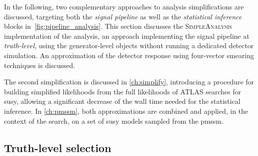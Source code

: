 In the following, two complementary approaches to analysis simplifications are discussed, targeting both the \textit{signal pipeline} as well as the \textit{statistical inference} blocks in~\cref{fig:pipeline_analysis}.
This section discusses the \textsc{SimpleAnalysis} implementation of the analysis, an approach implementing the signal pipeline at \textit{truth-level}, \ie using the generator-level objects without running a dedicated detector simulation. An approximation of the detector response using four-vector smearing techniques is discussed.

The second simplification is discussed in \cref{ch:simplify}, introducing a procedure for building simplified likelihoods from the full likelihoods of ATLAS searches for \gls{susy}, allowing a significant decrease of the wall time needed for the statistical inference. 
In \cref{ch:pmssm}, both approximations are combined and applied, in the context of the \onelepton search, on a set of \gls{susy} models sampled from the \gls{pmssm}.


\subsection{Truth-level selection}\label{sec:truth_selection}

